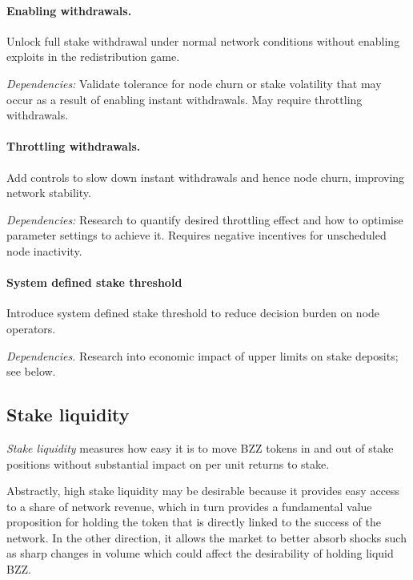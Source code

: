 \paragraph{Enabling withdrawals.}
    Unlock full stake withdrawal under normal network conditions without enabling exploits in the redistribution game.

    \emph{Dependencies:} 
    Validate tolerance for node churn or stake volatility that may occur as a result of enabling instant withdrawals.
    May require throttling withdrawals.

\paragraph{Throttling withdrawals.}
    Add controls to slow down instant withdrawals and hence node churn, improving network stability.
    
    \emph{Dependencies:} 
    Research to quantify desired throttling effect and how to optimise parameter settings to achieve it.
    Requires negative incentives for unscheduled node inactivity.

\paragraph{System defined stake threshold}
    Introduce system defined stake threshold to reduce decision burden on node operators.

    \emph{Dependencies.}
    Research into economic impact of upper limits on stake deposits; see below.


\subsection*{Stake liquidity}

\emph{Stake liquidity} measures how easy it is to move BZZ tokens in and out of stake positions without substantial impact on per unit returns to stake.

Abstractly, high stake liquidity may be desirable because it provides easy access to a share of network revenue, which in turn provides a fundamental value proposition for holding the token that is directly linked to the success of the network.
%
In the other direction, it allows the market to better absorb shocks such as sharp changes in volume which could affect the desirability of holding liquid BZZ.

